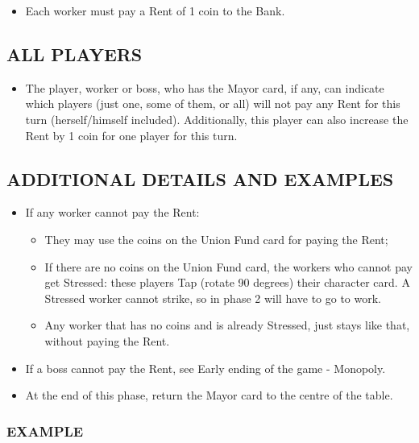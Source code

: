         \begin{itemize}
            \item Each worker must pay a Rent of 1 coin to the Bank.
        \end{itemize}
    
    \subsection{ALL PLAYERS}

        \begin{itemize}
            \item The player, worker or boss, who has the Mayor card, if any, can indicate
which players (just one, some of them, or all) will not pay any Rent for this
turn (herself/himself included). Additionally, this player can also increase the
Rent by 1 coin for one player for this turn.
        \end{itemize}
    
    \subsection{ADDITIONAL DETAILS AND EXAMPLES}

        \begin{itemize}
            \item If any worker cannot pay the Rent:
            \begin{itemize}
                \item They may use the coins on the Union Fund card for paying the
                Rent;
                \item If there are no coins on the Union Fund card, the workers who cannot
                pay get Stressed: these players Tap (rotate 90 degrees) their character
                card. A Stressed worker cannot strike, so in phase 2 will have to go to
                work.
                \item Any worker that has no coins and is already Stressed, just stays like
                that, without paying the Rent.
            \end{itemize}
            \item If a boss cannot pay the Rent, see Early ending of the game - Monopoly.
            \item At the end of this phase, return the Mayor card to the centre of the table.
        \end{itemize}
    
        \subsubsection{EXAMPLE}

